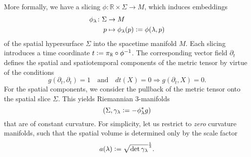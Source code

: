 More formally, we have a slicing $\phi\colon\mathbb R\times\Sigma\rightarrow M$, which induces embeddings
\begin{equation}
  \begin{aligned}
    \phi_\lambda\colon\Sigma\rightarrow {} & M \\
    p \mapsto {} & \phi_\lambda(p) \vcentcolon= \phi(\lambda,p)
  \end{aligned}
\end{equation}
of the spatial hypersurface $\Sigma$ into the spacetime manifold $M$. Each slicing introduces a time coordinate $t \vcentcolon= \pi_{\mathbb R} \circ \phi^{-1}$. The corresponding vector field $\partial_t$ defines the spatial and spatiotemporal components of the metric tensor by virtue of the conditions
\begin{equation}
  g(\partial_t,\partial_t) = 1\quad\text{and}\quad dt(X) = 0\Rightarrow g(\partial_t,X) = 0.
\end{equation}
For the spatial components, we consider the pullback of the metric tensor onto the spatial slice $\Sigma$. This yields Riemannian 3-manifolds
\begin{equation}
  (\Sigma, \gamma_\lambda \vcentcolon= -\phi_\lambda^\ast g)
\end{equation}
that are of constant curvature. For simplicity, let us restrict to \emph{zero} curvature manifolds, such that the spatial volume is determined only by the scale factor
\begin{equation}
  a(\lambda) \vcentcolon= \sqrt{\operatorname{det} \gamma_\lambda}^\frac{1}{3}.
\end{equation}

